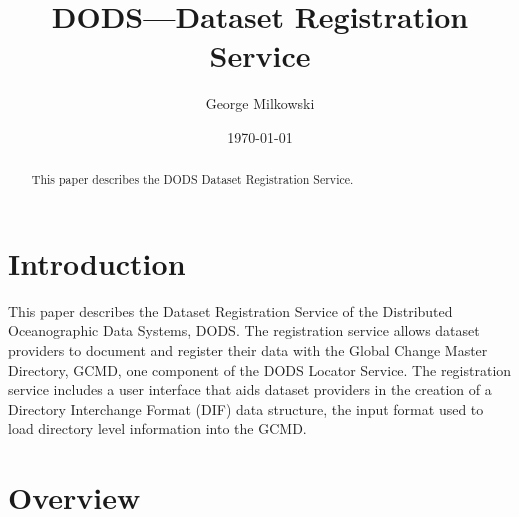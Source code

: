 
%






\title{DODS---Dataset Registration Service}
\author{George Milkowski}
\date{\today}

\maketitle

\begin{abstract}

  This paper describes the DODS Dataset Registration Service. 

\end{abstract}



\begin{htmlonly}
\end{htmlonly}

\clearpage

\tableofcontents

\clearpage

\section{Introduction}

This paper describes the Dataset Registration Service of the Distributed
Oceanographic Data Systems, DODS.  The registration service allows
dataset providers to document and register their data with the Global Change
Master Directory, GCMD, one component of the DODS Locator Service.
The registration service includes a user interface that aids dataset
providers in the creation of a Directory Interchange Format (DIF) data
structure, the input format used to load directory level information into the
GCMD.  

\section{Overview}

